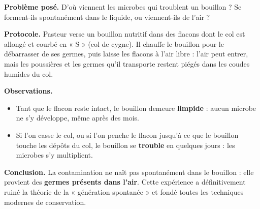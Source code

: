 \documentclass[11pt]{article}
\newcommand{\cle}[1]{{\popxbold\color{popdark}#1}}
\begin{document}
\begin{experience}
\textbf{Problème posé.} D'où viennent les microbes qui troublent un bouillon ? Se forment-ils spontanément dans le liquide, ou viennent-ils de l'air ?

\textbf{Protocole.} Pasteur verse un bouillon nutritif dans des flacons dont le col est allongé et courbé en « S » (col de \cle{cygne}). Il chauffe le bouillon pour le débarrasser de ses germes, puis laisse les flacons à l'air libre : l'air peut entrer, mais les poussières et les germes qu'il transporte restent piégés dans les coudes humides du col.

\textbf{Observations.}
\begin{itemize}
\item Tant que le flacon reste intact, le bouillon demeure \textbf{limpide} : aucun microbe ne s'y développe, même après des mois.
\item Si l'on casse le col, ou si l'on penche le flacon jusqu'à ce que le bouillon touche les dépôts du col, le bouillon se \textbf{trouble} en quelques jours : les microbes s'y multiplient.
\end{itemize}

\textbf{Conclusion.} La contamination ne naît pas spontanément dans le bouillon : elle provient des \textbf{germes présents dans l'air}. Cette expérience a définitivement ruiné la théorie de la « génération spontanée » et fondé toutes les techniques modernes de conservation.
\end{experience}
\end{document}
